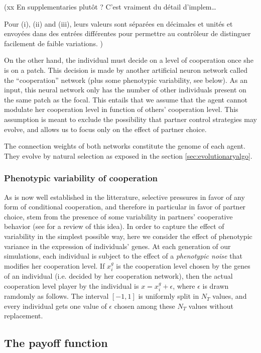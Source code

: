 \documentclass[twocolumn]{article}
\begin{document}
(xx En supplementaries plutôt ? C'est vraiment du détail d'implem…

Pour (i), (ii) and (iii), leurs valeurs sont séparées en décimales et unités et envoyées dans des entrées différentes pour permettre au contrôleur de distinguer facilement de faible variations.
)

On the other hand, the individual must decide on a level of cooperation once she is on a patch. This decision is made by another artificial neuron network called the ``cooperation'' network (plus some phenotypic variability, see below). As an input, this neural network only has the number of other individuals present on the same patch as the focal. This entails that we assume that the agent cannot modulate her cooperation level in function of others' cooperation level. This assumption is meant to exclude the possibility that partner control strategies may evolve, and allows us to focus only on the effect of partner choice.

The connection weights of both networks constitute the genome of each agent. They evolve by natural selection as exposed in the section \ref{sec:evolutionaryalgo}.


\subsubsection{Phenotypic variability of cooperation}\label{ssec:phenotypic_var}

As is now well established in the litterature, selective pressures in favor of any form of conditional cooperation, and therefore in particular in favor of partner choice, stem from the presence of some variability in partners’ cooperative behavior (see \cite{McNamara2010c} for a review of this idea). In order to capture the effect of variability in the simplest possible way, here we consider the effect of phenotypic variance in the expression of individuals' genes. At each generation of our simulations, each individual is subject to the effect of a \emph{phenotypic noise} that modifies her cooperation level. If $x_i^g$ is the cooperation level chosen by the genes of an individual (i.e. decided by her cooperation network), then the actual cooperation level player by the individual is $x = x_i^g + \epsilon$, where $\epsilon$ is drawn ramdomly as follows. The interval $[-1, 1]$ is uniformly split in $N_T$ values, and every individual gets one value of $\epsilon$ chosen among these $N_T$ values without replacement.


\subsection{The payoff function}
\end{document}
